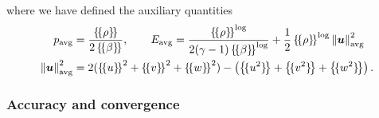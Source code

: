 \documentclass[10pt]{amsart}
\theoremstyle{definition}
\theoremstyle{lemma}
\theoremstyle{theorem}
\theoremstyle{assumption}
\newcommand{\nor}[1]{\left\| #1 \right\|}
\newcommand{\LRp}[1]{\left( #1 \right)}
\newcommand{\LRc}[1]{\left\{ #1 \right\}}
\newcommand{\avg}[1] {\ensuremath{\LRc{\!\{#1\}\!}}}
\begin{document}
{\begin{gather}
\end{gather}
where we have defined the auxiliary quantities
\begin{align}
p_{\rm avg} &= \frac{\avg{\rho}}{2\avg{\beta}}, \qquad E_{\rm avg} = \frac{\avg{\rho}^{\log}}{2(\gamma-1)\avg{\beta}^{\log}} + \frac{1}{2}\avg{\rho}^{\log}\nor{\bm{u}}^2_{\rm avg}\\
\nor{\bm{u}}^2_{\rm avg} &= 2(\avg{u}^2 + \avg{v}^2 + \avg{w}^2) - \LRp{\avg{u^2} +\avg{v^2} + \avg{w^2}}.\nonumber
\end{align}

\subsubsection{Accuracy and convergence}

}
\end{document}
